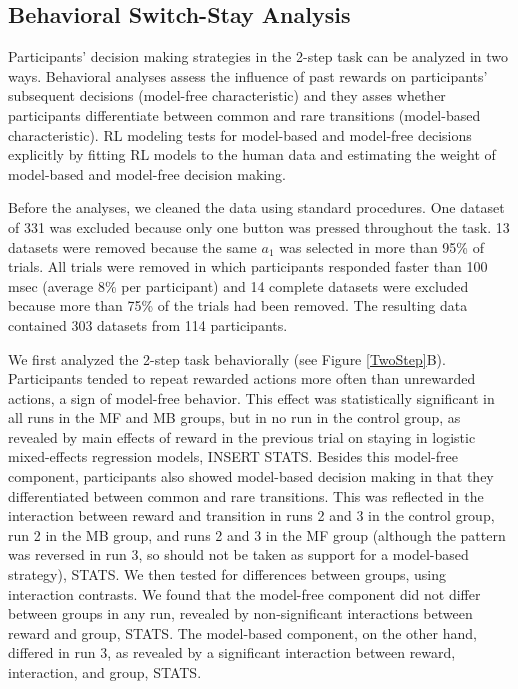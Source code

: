 \documentclass[11pt]{article} %
\begin{document}
\subsection{Behavioral Switch-Stay Analysis}
Participants' decision making strategies in the 2-step task can be analyzed in two ways. Behavioral analyses assess the influence of past rewards on participants' subsequent decisions (model-free characteristic) and they asses whether participants differentiate between common and rare transitions (model-based characteristic). RL modeling tests for model-based and model-free decisions explicitly by fitting RL models to the human data and estimating the weight of model-based and model-free decision making.

Before the analyses, we cleaned the data using standard procedures. One dataset of 331 was excluded because only one button was pressed throughout the task. 13 datasets were removed because the same $a_{1}$ was selected in more than 95\% of trials. All trials were removed in which participants responded faster than 100 msec (average 8\% per participant) and 14 complete datasets were excluded because more than 75\% of the trials had been removed. The resulting data contained 303 datasets from 114 participants.

We first analyzed the 2-step task behaviorally (see Figure \ref{TwoStep}B). Participants tended to repeat rewarded actions more often than unrewarded actions, a sign of model-free behavior. This effect was statistically significant in all runs in the MF and MB groups, but in no run in the control group, as revealed by main effects of reward in the previous trial on staying in logistic mixed-effects regression models, INSERT STATS. Besides this model-free component, participants also showed model-based decision making in that they differentiated between common and rare transitions. This was reflected in the interaction between reward and transition in runs 2 and 3 in the control group, run 2 in the MB group, and runs 2 and 3 in the MF group (although the pattern was reversed in run 3, so should not be taken as support for a model-based strategy), STATS. We then tested for differences between groups, using interaction contrasts. We found that the model-free component did not differ between groups in any run, revealed by non-significant interactions between reward and group, STATS. The model-based component, on the other hand, differed in run 3, as revealed by a significant interaction between reward, interaction, and group, STATS.
\end{document}
